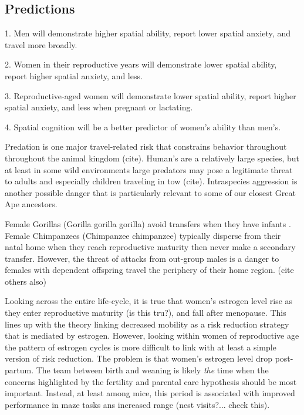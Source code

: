 	\subsection{Predictions}
	\label{sec:1.2}
	
1.  Men will demonstrate higher spatial ability, report lower spatial anxiety, and travel more broadly. 
	
2.  Women in their reproductive years will demonstrate lower spatial ability, report higher spatial anxiety, and less.

3.  Reproductive-aged women will demonstrate lower spatial ability, report higher spatial anxiety, and less when pregnant or lactating.

4.  Spatial cognition will be a better predictor of women's ability than men's. 


Predation is one major travel-related risk that constrains behavior throughout throughout the animal kingdom (cite).  Human's are a relatively large species, but at least in some wild environments large predators may pose a legitimate threat to adults and especially children traveling in tow (cite).  Intraspecies aggression is another possible danger that is particularly relevant to some of our closest Great Ape ancestors. 



Female Gorillas (Gorilla gorilla gorilla) avoid transfers when they have infants \cite{watts1989infanticide, stokes2003female}.  Female Chimpanzees (Chimpanzee chimpanzee) typically disperse from their natal home when they reach reproductive maturity then never make a secondary transfer.  However, the threat of attacks from out-group males is a danger to females with dependent offspring travel the periphery of their home region. \cite{mitani2002recent, watts1989infanticide} (cite others also)








Looking across the entire life-cycle, it is true that women's estrogen level rise as they enter reproductive maturity (is this tru?), and fall after menopause.  This lines up with the theory linking decreased mobility as a risk reduction strategy that is mediated by estrogen.  However, looking within women of reproductive age the pattern of estrogen cycles is more difficult to link with at least a simple version of risk reduction.  The problem is that women's estrogen level drop post-partum.  The team between  birth and weaning is likely \emph{the} time when the concerns highlighted by the fertility and parental care hypothesis should be most important. Instead, at least among mice, this period is associated with improved performance in maze tasks ans increased range (nest visits?... check this). 


